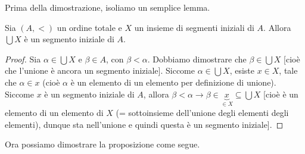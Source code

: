 \documentclass[11pt]{scrartcl}
\begin{document}
Prima della dimostrazione, isoliamo un semplice lemma.

\begin{lemma}
	Sia $(A,<)$ un ordine totale e $X$ un insieme di segmenti iniziali di $A$. Allora $\bigcup X$ è un segmento iniziale di $A$.
\end{lemma}

\begin{proof}
	Sia $\alpha \in \bigcup X$ e $\beta \in A$, con $\beta < \alpha$. Dobbiamo dimostrare che $\beta \in \bigcup X$ [cioè che l'unione è ancora un segmento iniziale].
	Siccome $\alpha \in \bigcup X$, esiste $x \in X$, tale che $\alpha \in x$ (cioè $\alpha$ è un elemento di un elemento per definizione di unione). Siccome $x$ è un segmento
	iniziale di $A$, allora $\beta < \alpha \rightarrow \beta \in \underbrace{x}_{\in X} \subseteq \bigcup X$ [cioè è un elemento di un elemento di $X$ (= sottoinsieme dell'unione degli elementi degli elementi), dunque sta nell'unione e quindi questa è un segmento iniziale].
\end{proof}

Ora possiamo dimostrare la proposizione come segue.
\end{document}
